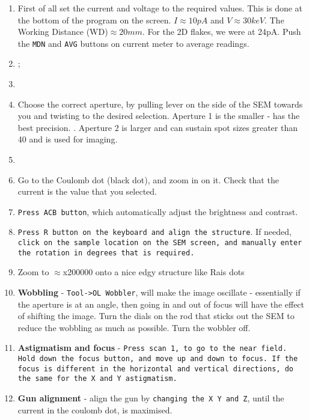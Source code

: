   \begin{enumerate}
  	\item First of all set the current and voltage to the required values. This is done at the bottom of the program on the screen. $I\approx10pA$ and $V\approx30keV$. The Working Distance (WD)$\approx20mm$. For the 2D flakes, we were at 24pA.  Push the \texttt{MDN} and \texttt{AVG} buttons on current meter to average readings.
  	\item {};
   	\item {}
   	\item Choose the correct aperture, by pulling lever on the side of the SEM towards you and twisting to the desired selection. Aperture 1 is the smaller - has the best precision. . Aperture 2 is larger and can sustain spot sizes greater than 40 and is used for imaging.
   	\item {}
  	\item Go to the Coulomb dot (black dot), and zoom in on it. Check that the current is the value that you selected.
  	\item \texttt{Press ACB button}, which automatically adjust the brightness and contrast.
  	\item \texttt{Press R button on the keyboard and align the structure}. If needed, \texttt{click on the sample location on the SEM screen, and manually enter the rotation in degrees that is required.}
  	\item Zoom to $\approx$x200000 onto a nice edgy structure like Rais dots
  	\item \textbf{Wobbling} - \texttt{Tool->OL Wobbler}, will make the image oscillate - essentially if the aperture is at an angle, then going in and out of focus will have the effect of shifting the image. Turn the dials on the rod that sticks out the SEM to reduce the wobbling as much as possible. Turn the wobbler off.
  	\item \textbf{Astigmatism and focus} - \texttt{Press scan 1, to go to the near field. Hold down the focus button, and move up and down to focus. If the focus is different in the horizontal and vertical directions, do the same for the X and Y astigmatism.} 
  	\item \textbf{Gun alignment} - align the gun by \texttt{changing the X Y and Z}, until the current in the coulomb dot, is maximised.
  \end{enumerate}

